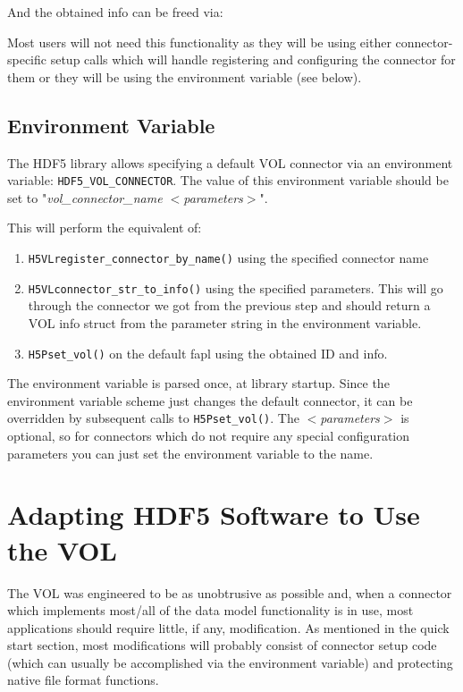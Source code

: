 \quad{}

And the obtained info can be freed via:

\quad{}

Most users will not need this functionality as they will be using either connector-specific setup calls which will handle registering and configuring the connector for them or they will be using the environment variable (see below).

\subsection{Environment Variable}

The HDF5 library allows specifying a default VOL connector via an environment variable: {\tt HDF5\_VOL\_CONNECTOR}. The value of this environment variable should be set to "\textit{vol\_connector\_name $<$parameters$>$}".

This will perform the equivalent of:

\begin{enumerate}
    \item {\tt H5VLregister\_connector\_by\_name()} using the specified connector name
    \item {\tt H5VLconnector\_str\_to\_info()} using the specified parameters. This will go through the connector we got from the previous step and should return a VOL info struct from the parameter string in the environment variable.
    \item {\tt H5Pset\_vol()} on the default fapl using the obtained ID and info.
\end{enumerate}

The environment variable is parsed once, at library startup. Since the environment variable scheme just changes the default connector, it can be overridden by subsequent calls to {\tt H5Pset\_vol()}. The \textit{$<$parameters$>$} is optional, so for connectors which do not require any special configuration parameters you can just set the environment variable to the name.

\section{Adapting HDF5 Software to Use the VOL}

The VOL was engineered to be as unobtrusive as possible and, when a connector which implements most/all of the data model functionality is in use, most applications should require little, if any, modification. As mentioned in the quick start section, most modifications will probably consist of connector setup code (which can usually be accomplished via the environment variable) and protecting native file format functions.

